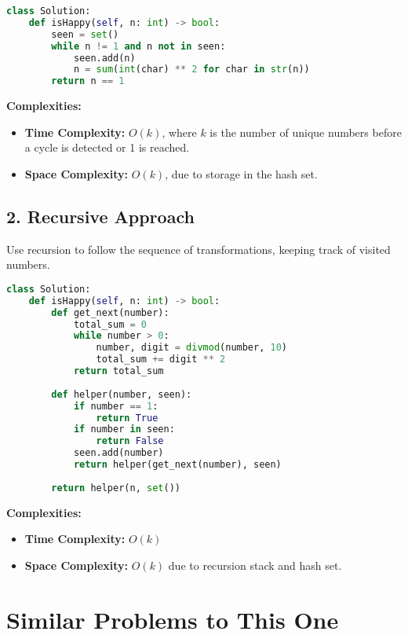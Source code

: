 \begin{lstlisting}[language=Python]
class Solution:
    def isHappy(self, n: int) -> bool:
        seen = set()
        while n != 1 and n not in seen:
            seen.add(n)
            n = sum(int(char) ** 2 for char in str(n))
        return n == 1
\end{lstlisting}

\textbf{Complexities:}
\begin{itemize}
    \item \textbf{Time Complexity:} \(O(k)\), where \(k\) is the number of unique numbers before a cycle is detected or 1 is reached.
    \item \textbf{Space Complexity:} \(O(k)\), due to storage in the hash set.
\end{itemize}

\subsection*{2. Recursive Approach}

Use recursion to follow the sequence of transformations, keeping track of visited numbers.

\begin{lstlisting}[language=Python]
class Solution:
    def isHappy(self, n: int) -> bool:
        def get_next(number):
            total_sum = 0
            while number > 0:
                number, digit = divmod(number, 10)
                total_sum += digit ** 2
            return total_sum
        
        def helper(number, seen):
            if number == 1:
                return True
            if number in seen:
                return False
            seen.add(number)
            return helper(get_next(number), seen)
        
        return helper(n, set())
\end{lstlisting}

\textbf{Complexities:}
\begin{itemize}
    \item \textbf{Time Complexity:} \(O(k)\)
    \item \textbf{Space Complexity:} \(O(k)\) due to recursion stack and hash set.
\end{itemize}

\section*{Similar Problems to This One}

